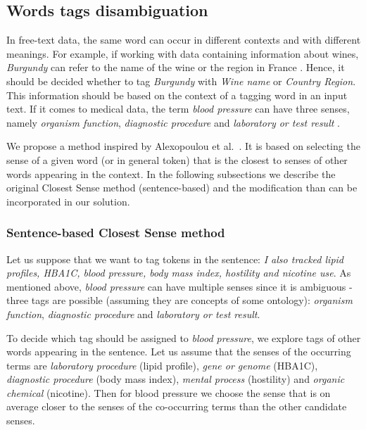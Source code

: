 \documentclass[11pt]{article}
\begin{document}
\subsection{Words tags disambiguation}

In free-text data, the same word can occur in different contexts and with different meanings. For example, if working with data containing information about wines, \textit{Burgundy} can refer to the name of the wine or the region in France \cite{burg_example}. Hence, it should be decided whether to tag \textit{Burgundy} with \textit{Wine name} or \textit{Country Region}. This information should be based on the context of a tagging word in an input text. If it comes to medical data, the term \textit{blood pressure} can have three senses, namely \textit{organism function}, \textit{diagnostic procedure} and \textit{laboratory or test result} \cite{ClosestSense}.

We propose a method inspired by Alexopoulou
et al.~. It is based on selecting the sense of a given word (or in general token) that is the closest to senses of other words appearing in the context. In the following subsections we describe the original Closest Sense method (sentence-based) and the modification than can be incorporated in our solution. 

\subsubsection{Sentence-based Closest Sense method}
Let us suppose that we want to tag tokens in the sentence: \textit{I also tracked lipid profiles, HBA1C, blood pressure, body mass index, hostility and nicotine use}. As mentioned above, \textit{blood pressure} can have multiple senses since it is ambiguous - three tags are possible (assuming they are concepts of some ontology): \textit{organism function}, \textit{diagnostic procedure} and \textit{laboratory or test result}.

To decide which tag should be assigned to \textit{blood pressure}, we explore tags of other words appearing in the sentence. Let us assume that the senses of the occurring terms are \textit{laboratory procedure} (lipid profile),
\textit{gene or genome} (HBA1C), \textit{diagnostic procedure} (body mass index), \textit{mental process} (hostility) and \textit{organic chemical} (nicotine). Then for blood pressure we choose the sense that is on average closer to the senses of the co-occurring terms than the other candidate senses.
\end{document}
